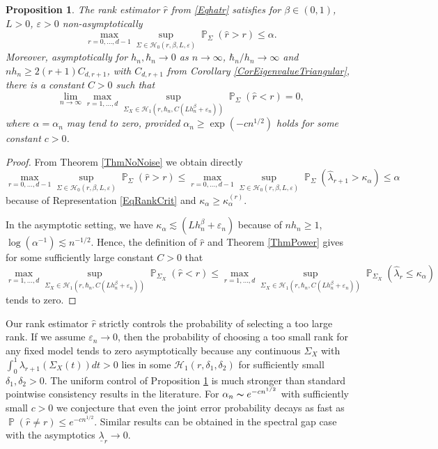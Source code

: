 \documentclass[preprint,aos]{imsart}
\numberwithin{equation}{section}
\newtheorem{proposition}[satz]{Proposition}
\theoremstyle{remark}
\DeclareMathOperator{\PP}{{\mathbb P}}
\providecommand{\eps}{\varepsilon}
\renewcommand{\le}{\leqslant}
\renewcommand{\ge}{\geqslant}
\begin{document}
\begin{proposition}\label{PropRankDetect}
The rank estimator $\hat r$ from \eqref{Eqhatr} satisfies for $\beta\in(0,1)$, $L>0$, $\eps>0$ non-asymptotically
\[ \max_{r=0,\ldots,d-1}\sup_{\Sigma\in {\mathcal H}_0(r,\beta,L,\eps)}\PP_\Sigma(\hat r>r)\le \alpha.\]
Moreover, asymptotically for $h_n,\hbar_n\to 0$ as $n\to\infty$, $\hbar_n/h_n\to\infty$ and $nh_n\ge 2(r+1)C_{d,r+1}$, with $C_{d,r+1}$ from Corollary \ref{CorEigenvalueTriangular}, there is a constant $C>0$ such that
\[ \lim_{n\to\infty}\max_{r=1,\ldots,d}\sup_{\Sigma_X\in {\mathcal H}_1(r,\hbar_n,C(Lh_n^\beta+\eps_n))}\PP_\Sigma(\hat r<r)=0,\]
where $\alpha=\alpha_n$ may tend to zero, provided $\alpha_n\ge \exp(-cn^{1/2})$ holds for some constant $c>0$.
\end{proposition}

\begin{proof}
From Theorem \ref{ThmNoNoise} we obtain directly
\[ \max_{r=0,\ldots,d-1}\sup_{\Sigma\in {\mathcal H}_0(r,\beta,L,\eps)}\PP_\Sigma(\hat r>r)\le \max_{r=0,\ldots,d-1}\sup_{\Sigma\in {\mathcal H}_0(r,\beta,L,\eps)}\PP_\Sigma(\hat \lambda_{r+1}> \kappa_\alpha)\le \alpha
\]
because of  Representation \eqref{EqRankCrit} and $\kappa_\alpha\ge \kappa_\alpha^{(r)}$.

In the asymptotic setting, we have $\kappa_\alpha\lesssim (Lh_n^\beta+\eps_n)$ because of $nh_n\ge 1$, $\log(\alpha^{-1})\lesssim n^{-1/2}$. Hence, the definition of $\hat r$ and Theorem \ref{ThmPower} gives for some sufficiently large constant $C>0$ that
\[ \max_{r=1,\ldots,d}\sup_{\Sigma_X\in {\mathcal H}_1(r,\hbar_n,C(Lh_n^\beta+\eps_n))}\PP_{\Sigma_X}(\hat r<r) \le \max_{r=1,\ldots,d}\sup_{\Sigma_X\in {\mathcal H}_1(r,\hbar_n,C(Lh_n^\beta+\eps_n))} \PP_{\Sigma_X}(\hat\lambda_{r}\le\kappa_\alpha)
\]
tends to zero.
\end{proof}

Our rank estimator $\hat r$ strictly controls the probability of selecting a too large rank. If we assume $\eps_n\to 0$, then the probability of choosing a too small rank for any fixed model tends to zero asymptotically because any continuous $\Sigma_X$ with $\int_0^1\lambda_{r+1}(\Sigma_X(t))dt>0$ lies in some ${\mathcal H}_1(r,\delta_1,\delta_2)$ for sufficiently small $\delta_1,\delta_2>0$. The uniform control of Proposition \ref{PropRankDetect} is much stronger than standard pointwise consistency results in the literature. For $\alpha_n\thicksim e^{-cn^{1/2}}$ with sufficiently small $c>0$ we conjecture that even the joint error probability decays as fast as $\PP(\hat r\not=r)\le e^{-cn^{1/2}}$. Similar results can be obtained in the spectral gap case with the asymptotics $\underline\lambda_r\to 0$.
\end{document}
